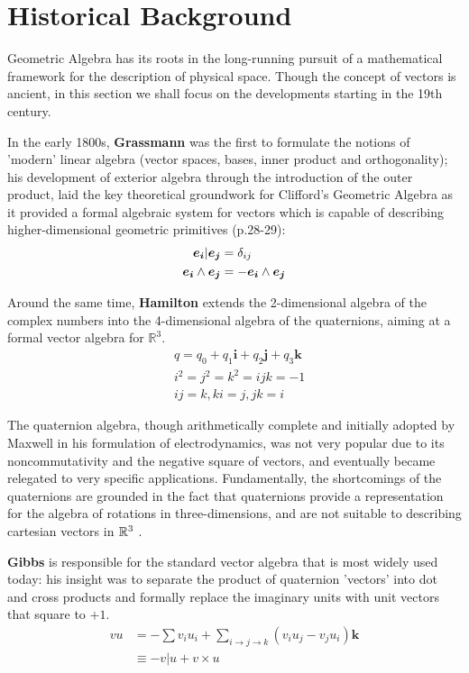 \section{Historical Background}
Geometric Algebra has its roots in the long-running pursuit of a mathematical framework for the description of physical space. Though the concept of vectors is ancient, in this section we shall focus on the developments starting in the 19th century.

In the early 1800s, \textbf{Grassmann} was the first to formulate the notions of 'modern' linear algebra (vector spaces, bases, inner product and orthogonality); his development of exterior algebra through the introduction of the outer product, laid the key theoretical groundwork for Clifford's Geometric Algebra as it provided a formal algebraic system for vectors which is capable of describing higher-dimensional geometric primitives (p.28-29)\cite{ga-foundations}:
\begin{align*}
	\boldsymbol{e_i} | \boldsymbol{e_j} &= \delta_{ij}\\
	\boldsymbol{e_i}\wedge \boldsymbol{e_j} &= -\boldsymbol{e_i}\wedge \boldsymbol{e_j}\\
\end{align*}

Around the same time, \textbf{Hamilton} extends the 2-dimensional algebra of the complex numbers into the 4-dimensional algebra of the quaternions, aiming at a formal vector algebra for $\mathbb{R}^3$.
\begin{align*}
    &q = q_0 + q_1\boldsymbol{i} + q_2\boldsymbol{j} + q_3\boldsymbol{k}\\
    &i^2 = j^2 = k^2 = ijk = -1\\
    &ij = k, ki = j, jk = i
\end{align*}

The quaternion algebra, though arithmetically complete and initially adopted by Maxwell in his formulation of electrodynamics, was not very popular due to its noncommutativity and the negative square of vectors, and eventually became relegated to very specific applications. Fundamentally, the shortcomings of the quaternions are grounded in the fact that quaternions provide a representation for the algebra of rotations in three-dimensions, and are not suitable to describing cartesian vectors in $\mathbb{R}^3$ \cite{ga-history}.

\textbf{Gibbs} is responsible for the standard vector algebra that is most widely used today: his insight was to separate the product of quaternion 'vectors' into dot and cross products and formally replace the imaginary units with unit vectors that square to $+1$.
\begin{align*}
	vu &= -\sum v_iu_i + \sum_{i\to j\to k}(v_iu_j - v_ju_i)\boldsymbol{k} \\
	&\equiv -v | u + v \times u
\end{align*}

